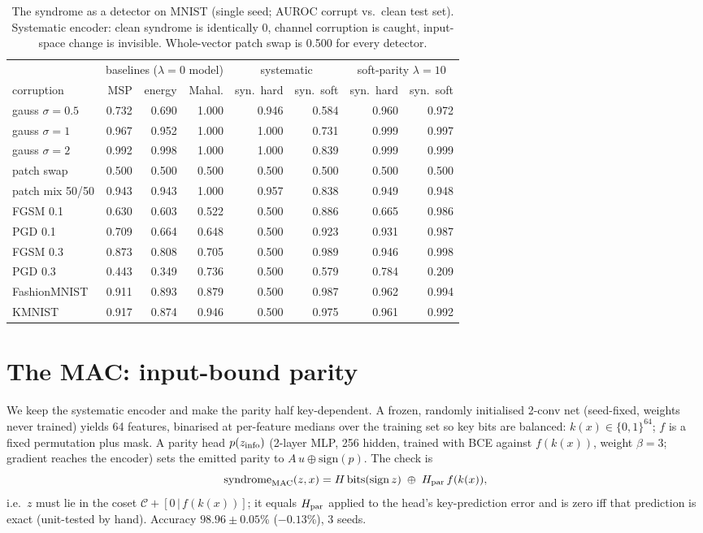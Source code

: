 \documentclass[10pt,twocolumn]{article}
\begin{document}
\begin{table}[t]
\centering\small
\begin{tabular}{l rrr rr | rr}
\toprule
& \multicolumn{3}{c}{baselines ($\lambda=0$ model)} & \multicolumn{2}{c|}{systematic} & \multicolumn{2}{c}{soft-parity $\lambda=10$}\\
corruption & MSP & energy & Mahal. & syn.\ hard & syn.\ soft & syn.\ hard & syn.\ soft\\
\midrule
gauss $\sigma{=}0.5$ & 0.732 & 0.690 & 1.000 & 0.946 & 0.584 & 0.960 & 0.972\\
gauss $\sigma{=}1$ & 0.967 & 0.952 & 1.000 & 1.000 & 0.731 & 0.999 & 0.997\\
gauss $\sigma{=}2$ & 0.992 & 0.998 & 1.000 & 1.000 & 0.839 & 0.999 & 0.999\\
patch swap & 0.500 & 0.500 & 0.500 & 0.500 & 0.500 & 0.500 & 0.500\\
patch mix 50/50 & 0.943 & 0.943 & 1.000 & 0.957 & 0.838 & 0.949 & 0.948\\
FGSM 0.1 & 0.630 & 0.603 & 0.522 & 0.500 & 0.886 & 0.665 & 0.986\\
PGD 0.1 & 0.709 & 0.664 & 0.648 & 0.500 & 0.923 & 0.931 & 0.987\\
FGSM 0.3 & 0.873 & 0.808 & 0.705 & 0.500 & 0.989 & 0.946 & 0.998\\
PGD 0.3 & 0.443 & 0.349 & 0.736 & 0.500 & 0.579 & 0.784 & 0.209\\
FashionMNIST & 0.911 & 0.893 & 0.879 & 0.500 & 0.987 & 0.962 & 0.994\\
KMNIST & 0.917 & 0.874 & 0.946 & 0.500 & 0.975 & 0.961 & 0.992\\
\bottomrule
\end{tabular}
\caption{The syndrome as a detector on MNIST (single seed; AUROC corrupt vs.\ clean
test set). Systematic encoder: clean syndrome is identically 0, channel corruption is
caught, input-space change is invisible. Whole-vector patch swap is 0.500 for every
detector.}
\label{tab:r3}
\end{table}

\section{The MAC: input-bound parity}\label{sec:mac}
We keep the systematic encoder and make the parity half key-dependent. A frozen,
randomly initialised 2-conv net (seed-fixed, weights never trained) yields 64
features, binarised at per-feature medians over the training set so key bits are
balanced: $k(x)\in\{0,1\}^{64}$; $f$ is a fixed permutation plus mask. A parity head
$p(z_{\rm info})$ (2-layer MLP, 256 hidden, trained with BCE against $f(k(x))$, weight
$\beta{=}3$; gradient reaches the encoder) sets the emitted parity to
$A\,u\oplus\mathrm{sign}(p)$. The check is
\[
\mathrm{syndrome}_{\rm MAC}(z,x)=H\,\mathrm{bits}(\mathrm{sign}\,z)\;\oplus\;H_{\rm par}\,f(k(x)),
\]
i.e.\ $z$ must lie in the coset $\mathcal{C}+[0\,|\,f(k(x))]$; it equals $H_{\rm par}$
applied to the head's key-prediction error and is zero iff that prediction is exact
(unit-tested by hand). Accuracy $98.96\pm0.05$\% ($-0.13$\%), 3 seeds.
\end{document}
